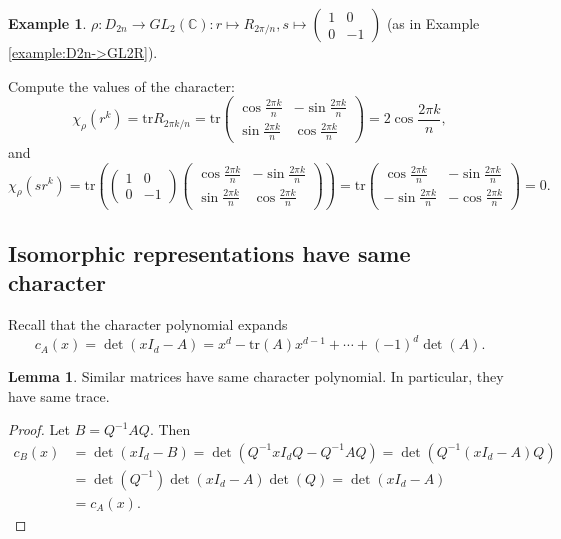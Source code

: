 \documentclass[a4paper]{article}
\newcommand{\tr}{\text{tr}}
\newcommand{\C}{\mathbb{C}}
\theoremstyle{definition}
\newtheorem{lemma}[defn]{Lemma}
\newtheorem{example}[defn]{Example}
\begin{document}
\begin{example}
$\rho:D_{2n}\rightarrow GL_2(\C):r\mapsto R_{2\pi/n}, s\mapsto \begin{pmatrix}1&0\\0&-1\end{pmatrix}$ (as in Example \ref{example:D2n->GL2R}).

Compute the values of the character:
\[
\chi_\rho(r^k)=\tr R_{2\pi k/n}=\tr \begin{pmatrix}
\cos \frac{2\pi k}{n} & -\sin \frac{2\pi k}{n} \\ \sin \frac{2\pi k}{n} & \cos \frac{2\pi k}{n}
\end{pmatrix}=2 \cos \frac{2\pi k}{n},
\]
and
\[
\chi_\rho(sr^k)=\tr\left( \begin{pmatrix}1&0\\0&-1\end{pmatrix}\begin{pmatrix}
\cos \frac{2\pi k}{n} & -\sin \frac{2\pi k}{n} \\ \sin \frac{2\pi k}{n} & \cos \frac{2\pi k}{n}
\end{pmatrix} \right)=\tr\begin{pmatrix}
\cos \frac{2\pi k}{n} & -\sin \frac{2\pi k}{n} \\ -\sin \frac{2\pi k}{n} & -\cos \frac{2\pi k}{n}
\end{pmatrix}=0.
\]
\end{example}

\subsection{Isomorphic representations have same character}
Recall that the character polynomial expands
\[
c_A(x)=\det (xI_d-A)=x^d-\tr(A)x^{d-1}+\cdots+(-1)^d \det(A).
\]

\begin{lemma}
\label{lemma:simmatsharecharpol}
Similar matrices have same character polynomial. In particular, they have same trace.
\end{lemma}
\begin{proof}
Let $B=Q^{-1}AQ$. Then
\[
\begin{aligned}
c_B(x)&=\det(xI_d-B)=\det\left(Q^{-1}xI_dQ-Q^{-1}AQ\right)=\det\left(Q^{-1}(xI_d-A)Q\right)\\
&=\det\left(Q^{-1}\right)\det(xI_d-A)\det(Q)=\det(xI_d-A)\\
&=c_A(x).
\end{aligned}
\]
\end{proof}
\end{document}

